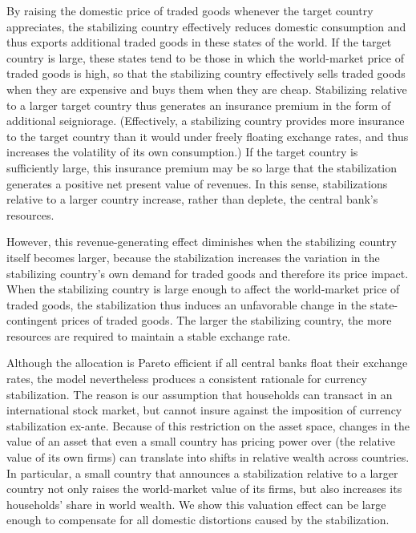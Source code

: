 \documentclass[12pt,letter]{article}
\theoremstyle{break} \theorembodyfont{\normalfont\itshape}
\theoremstyle{break}
\theoremstyle{break} \theorembodyfont{\normalfont\itshape}
\theoremstyle{break} \theorembodyfont{\normalfont\itshape}
\begin{document}
By raising the domestic price of traded goods whenever the target
country appreciates, the stabilizing country effectively reduces
domestic consumption and thus exports additional traded goods in these
states of the world. If the target country is large, these states tend
to be those in which the world-market price of traded goods is high,
so that the stabilizing country effectively sells traded goods when
they are expensive and buys them when they are cheap. Stabilizing
relative to a larger target country thus generates an insurance
premium in the form of additional seigniorage. (Effectively, a
stabilizing country provides more insurance to the target country than
it would under freely floating exchange rates, and thus increases the
volatility of its own consumption.) If the target country is
sufficiently large, this insurance premium may be so large that the
stabilization generates a positive net present value of revenues. In
this sense, stabilizations relative to a larger country increase,
rather than deplete, the central bank's resources.

However, this revenue-generating effect diminishes when the
stabilizing country itself becomes larger, because the stabilization
increases the variation in the stabilizing country's own demand for
traded goods and therefore its price impact. When the stabilizing
country is large enough to affect the world-market price of traded
goods, the stabilization thus induces an unfavorable change in the
state-contingent prices of traded goods. The larger the stabilizing
country, the more resources are required to maintain a stable exchange
rate.

Although the allocation is Pareto efficient if all central banks float
their exchange rates, the model nevertheless produces a consistent
rationale for currency stabilization. The reason is our assumption
that households can transact in an international stock market, but
cannot insure against the imposition of currency stabilization
ex-ante. Because of this restriction on the asset space, changes in
the value of an asset that even a small country has pricing power over
(the relative value of its own firms) can translate into shifts in
relative wealth across countries. In particular, a small country that
announces a stabilization relative to a larger country not only raises
the world-market value of its firms, but also increases its
households' share in world wealth. We show this valuation effect can
be large enough to compensate for all domestic distortions caused by
the stabilization.
\end{document}
